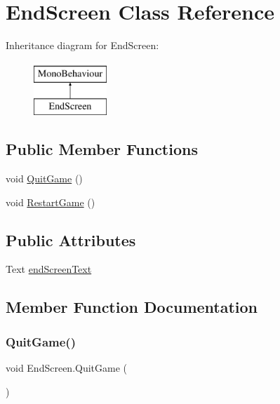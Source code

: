 \hypertarget{classEndScreen}{}\section{End\+Screen Class Reference}
\label{classEndScreen}
Inheritance diagram for End\+Screen\+:\begin{figure}[H]
\begin{center}
\leavevmode
\includegraphics[height=2.000000cm]{classEndScreen}
\end{center}
\end{figure}
\subsection*{Public Member Functions}
\begin{DoxyCompactItemize}
\item 
void \hyperlink{classEndScreen_af2017ebe82384b7f8b8a3b7ce423ada0}{Quit\+Game} ()
\item 
void \hyperlink{classEndScreen_a3c4a935e0f51b7853611616db8f766a8}{Restart\+Game} ()
\end{DoxyCompactItemize}
\subsection*{Public Attributes}
\begin{DoxyCompactItemize}
\item 
Text \hyperlink{classEndScreen_a67d4865ee98044882c46d771962e7eb8}{end\+Screen\+Text}
\end{DoxyCompactItemize}


\subsection{Member Function Documentation}
\mbox{\label{classEndScreen_af2017ebe82384b7f8b8a3b7ce423ada0}} 
\subsubsection{\texorpdfstring{Quit\+Game()}{QuitGame()}}
{\footnotesize\ttfamily void End\+Screen.\+Quit\+Game (\begin{DoxyParamCaption}{ }\end{DoxyParamCaption})\hspace{0.3cm}{\ttfamily [inline]}}

